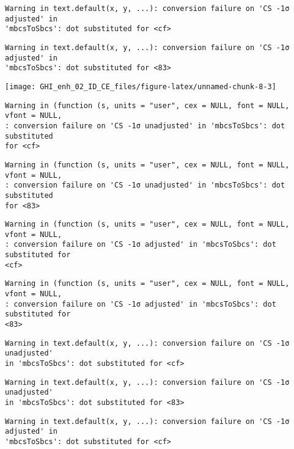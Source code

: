 \documentclass[
  10pt,
  a4paper,oneside]{article}
\begin{document}
\begin{verbatim}
Warning in text.default(x, y, ...): conversion failure on 'CS -1σ adjusted' in
'mbcsToSbcs': dot substituted for <cf>
\end{verbatim}

\begin{verbatim}
Warning in text.default(x, y, ...): conversion failure on 'CS -1σ adjusted' in
'mbcsToSbcs': dot substituted for <83>
\end{verbatim}

\begin{center}\texttt{[image: GHI\_enh\_02\_ID\_CE\_files/figure-latex/unnamed-chunk-8-3]} \end{center}

\begin{verbatim}
Warning in (function (s, units = "user", cex = NULL, font = NULL, vfont = NULL,
: conversion failure on 'CS -1σ unadjusted' in 'mbcsToSbcs': dot substituted
for <cf>
\end{verbatim}

\begin{verbatim}
Warning in (function (s, units = "user", cex = NULL, font = NULL, vfont = NULL,
: conversion failure on 'CS -1σ unadjusted' in 'mbcsToSbcs': dot substituted
for <83>
\end{verbatim}

\begin{verbatim}
Warning in (function (s, units = "user", cex = NULL, font = NULL, vfont = NULL,
: conversion failure on 'CS -1σ adjusted' in 'mbcsToSbcs': dot substituted for
<cf>
\end{verbatim}

\begin{verbatim}
Warning in (function (s, units = "user", cex = NULL, font = NULL, vfont = NULL,
: conversion failure on 'CS -1σ adjusted' in 'mbcsToSbcs': dot substituted for
<83>
\end{verbatim}

\begin{verbatim}
Warning in text.default(x, y, ...): conversion failure on 'CS -1σ unadjusted'
in 'mbcsToSbcs': dot substituted for <cf>
\end{verbatim}

\begin{verbatim}
Warning in text.default(x, y, ...): conversion failure on 'CS -1σ unadjusted'
in 'mbcsToSbcs': dot substituted for <83>
\end{verbatim}

\begin{verbatim}
Warning in text.default(x, y, ...): conversion failure on 'CS -1σ adjusted' in
'mbcsToSbcs': dot substituted for <cf>
\end{verbatim}
\end{document}

